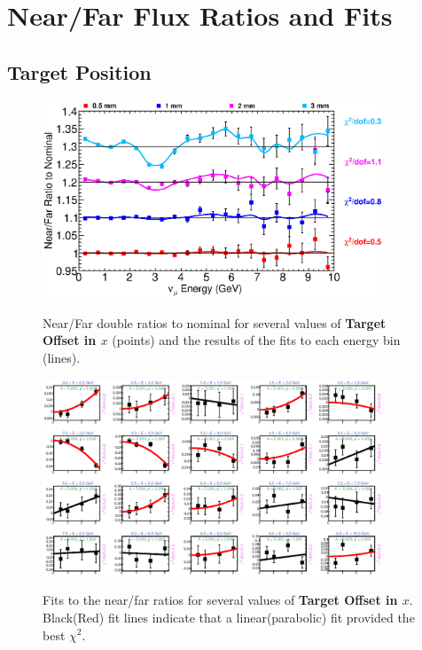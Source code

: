 \section{Near/Far Flux Ratios and Fits}
\label{app:nof_plots}

\subsection{Target Position}

\begin{figure}[ht]
  \begin{center}
    {\includegraphics[width=4.0in]{figures/TargetXOffset_nof_summary.eps}}
  \end{center}
\caption{ Near/Far double ratios to nominal for several values of {\bf Target Offset in $x$} (points) and the results of the fits to each energy bin (lines).}
\end{figure}

\begin{figure}[hb]
  \begin{center}
    {\includegraphics[width=4.0in]{figures/TargetXOffset_nof_fits.eps}}
  \end{center}
\caption{ Fits to the near/far ratios for several values of {\bf Target Offset in $x$}. Black(Red) fit lines indicate that a linear(parabolic) fit provided the best $\chi^2$. }
\end{figure}

